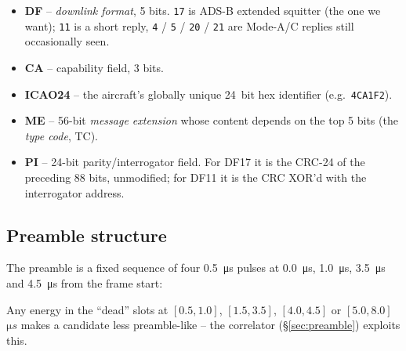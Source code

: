 \documentclass[11pt,a4paper]{article}
\begin{document}
\begin{itemize}
  \item \textbf{DF} -- \emph{downlink format}, 5 bits.  \texttt{17} is ADS-B
        extended squitter (the one we want); \texttt{11} is a short reply,
        \texttt{4} / \texttt{5} / \texttt{20} / \texttt{21} are Mode-A/C
        replies still occasionally seen.
  \item \textbf{CA} -- capability field, 3 bits.
  \item \textbf{ICAO24} -- the aircraft's globally unique
        \SI{24}{bit} hex identifier (e.g.\ \texttt{4CA1F2}).
  \item \textbf{ME} -- 56-bit \emph{message extension} whose content
        depends on the top 5 bits (the \emph{type code}, TC).
  \item \textbf{PI} -- 24-bit parity/interrogator field.  For DF17 it is
        the CRC-24 of the preceding 88 bits, unmodified; for DF11 it is
        the CRC XOR'd with the interrogator address.
\end{itemize}

\subsection{Preamble structure}

The preamble is a fixed sequence of four \SI{0.5}{\micro s} pulses at
\SI{0.0}{\micro s}, \SI{1.0}{\micro s}, \SI{3.5}{\micro s} and
\SI{4.5}{\micro s} from the frame start:

\begin{center}
\end{center}

Any energy in the ``dead'' slots at $[0.5,1.0]$, $[1.5,3.5]$,
$[4.0,4.5]$ or $[5.0,8.0]$~$\si{\micro s}$ makes a candidate less
preamble-like -- the correlator (\S\ref{sec:preamble}) exploits this.
\end{document}
